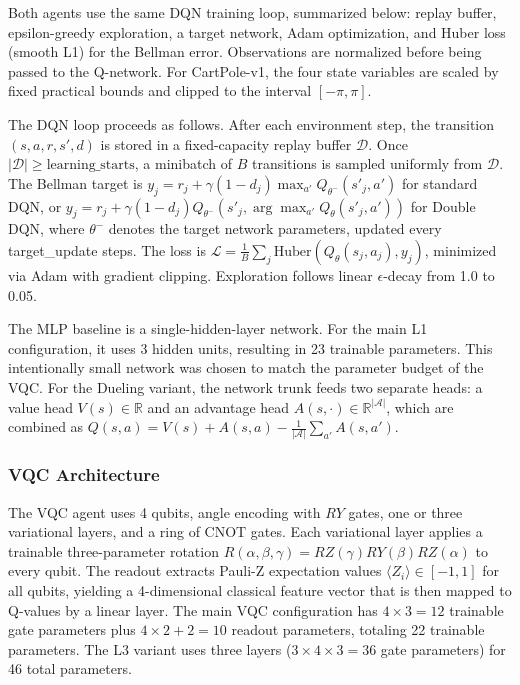Both agents use the same DQN training loop, summarized below: replay buffer,
epsilon-greedy exploration, a target network, Adam optimization, and Huber
loss (smooth L1) for the Bellman error. Observations are normalized
before being passed to the Q-network. For CartPole-v1, the four state variables
are scaled by fixed practical bounds and clipped to the interval $[-\pi,\pi]$.

The DQN loop proceeds as follows. After each environment step, the transition
$(s, a, r, s', d)$ is stored in a fixed-capacity replay buffer $\mathcal{D}$.
Once $|\mathcal{D}| \geq \text{learning\_starts}$, a minibatch of $B$
transitions is sampled uniformly from $\mathcal{D}$. The Bellman target is
$y_j = r_j + \gamma (1-d_j) \max_{a'} Q_{\theta^-}(s'_j, a')$ for standard
DQN, or $y_j = r_j + \gamma (1-d_j) Q_{\theta^-}(s'_j, \arg\max_{a'}
Q_\theta(s'_j, a'))$ for Double DQN, where $\theta^-$ denotes the target
network parameters, updated every target\_update steps. The loss is
$\mathcal{L} = \frac{1}{B}\sum_j \text{Huber}(Q_\theta(s_j, a_j), y_j)$,
minimized via Adam with gradient clipping. Exploration follows linear
$\epsilon$-decay from 1.0 to 0.05.

The MLP baseline is a single-hidden-layer network. For the main L1
configuration, it uses 3 hidden units, resulting in 23 trainable parameters.
This intentionally small network was chosen to match the parameter budget of
the VQC. For the Dueling variant, the network trunk feeds two separate heads:
a value head $V(s) \in \mathbb{R}$ and an advantage head $A(s,\cdot) \in
\mathbb{R}^{|\mathcal{A}|}$, which are combined as $Q(s,a) = V(s) + A(s,a)
- \frac{1}{|\mathcal{A}|}\sum_{a'} A(s,a')$.

\subsubsection*{VQC Architecture}

The VQC agent uses 4 qubits, angle encoding with $RY$ gates, one or three
variational layers, and a ring of CNOT gates. Each variational layer applies a
trainable three-parameter rotation $R(\alpha,\beta,\gamma) = RZ(\gamma)RY(\beta)
RZ(\alpha)$ to every qubit. The readout extracts Pauli-Z expectation values
$\langle Z_i \rangle \in [-1,1]$ for all qubits, yielding a 4-dimensional
classical feature vector that is then mapped to Q-values by a linear layer.
The main VQC configuration has $4 \times 3 = 12$ trainable gate parameters plus
$4 \times 2 + 2 = 10$ readout parameters, totaling 22 trainable parameters.
The L3 variant uses three layers ($3 \times 4 \times 3 = 36$ gate parameters)
for 46 total parameters.

